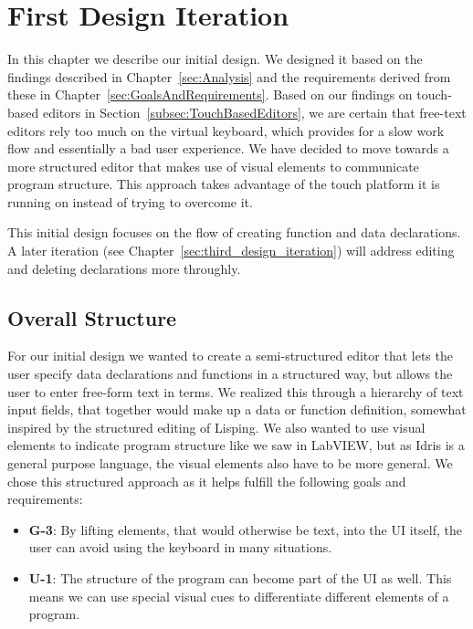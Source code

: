 \chapter{First Design Iteration}
\label{sec:InitialDesign}

In this chapter we describe our initial design. 
We designed it based on the findings described in Chapter~\ref{sec:Analysis} and the requirements derived from these in Chapter~\ref{sec:GoalsAndRequirements}.
Based on our findings on touch-based editors in Section~\ref{subsec:TouchBasedEditors}, we are certain that free-text editors rely too much on the virtual keyboard, which provides for a slow work flow and essentially a bad user experience.
We have decided to move towards a more structured editor that makes use of
visual elements to communicate program structure. This approach takes
advantage of the touch platform it is running on instead of trying to overcome
it.

This initial design focuses on the flow of creating function and data declarations. A later iteration (see Chapter~\ref{sec:third_design_iteration}) will address editing and deleting declarations more throughly.

\section{Overall Structure}
For our initial design we wanted to create a semi-structured editor that lets the user specify data declarations and functions in a structured way, but allows the user to enter free-form text
in terms.
We realized this through a hierarchy of text input fields, that together would make up a data or function definition, somewhat inspired by the structured editing of Lisping.
We also wanted to use visual elements to indicate program structure like we saw in LabVIEW, but as Idris is a general purpose language, the visual elements also have to be more general.
We chose this structured approach as it helps fulfill the following goals and requirements:
\begin{itemize}
	\item \textbf{G-3}: By lifting elements, that would otherwise be text, into the UI itself, the user can avoid using the keyboard in many situations.
	\item \textbf{U-1}: The structure of the program can become part of the UI as well. 
	This means we can use special visual cues to differentiate different elements of a program. 
\end{itemize}

